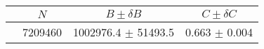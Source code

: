 \begin{tabular}{lccc}
\hline
    &   $N$   & $B \pm \delta B$  &  $C \pm \delta C$ \\
\hline
                               & 7209460    & 1002976.4  $\pm$ 51493.5 & 0.663      $\pm$ 0.004 \\
\hline
\end{tabular}
